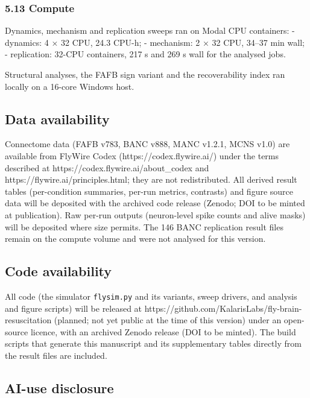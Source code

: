 \documentclass[11pt]{article}
\begin{document}
\subsubsection{5.13 Compute}\label{compute}

Dynamics, mechanism and replication sweeps ran on Modal CPU containers:
- dynamics: 4 × 32 CPU, 24.3 CPU-h;
- mechanism: 2 × 32 CPU, 34--37 min wall;
- replication: 32-CPU containers, 217 s and 269 s wall for the analysed jobs.

Structural analyses, the FAFB sign variant and the recoverability index ran locally on a 16-core Windows host.

\subsection{Data availability}\label{data-availability}

Connectome data (FAFB v783, BANC v888, MANC v1.2.1, MCNS v1.0) are available from FlyWire Codex (https://codex.flywire.ai/) under the terms described at https://codex.flywire.ai/about\_codex and https://flywire.ai/principles.html; they are not redistributed. All derived result tables (per-condition summaries, per-run metrics, contrasts) and figure source data will be deposited with the archived code release (Zenodo; DOI to be minted at publication). Raw per-run outputs (neuron-level spike counts and alive masks) will be deposited where size permits. The 146 BANC replication result files remain on the compute volume and were not analysed for this version.

\subsection{Code availability}\label{code-availability}

All code (the simulator \texttt{flysim.py} and its variants, sweep drivers, and analysis and figure scripts) will be released at https://github.com/KalarisLabs/fly-brain-resuscitation (planned; not yet public at the time of this version) under an open-source licence, with an archived Zenodo release (DOI to be minted). The build scripts that generate this manuscript and its supplementary tables directly from the result files are included.

\subsection{AI-use disclosure}\label{ai-use-disclosure}
\end{document}
